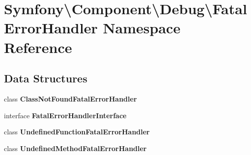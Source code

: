 \section{Symfony\textbackslash{}Component\textbackslash{}Debug\textbackslash{}Fatal\+Error\+Handler Namespace Reference}
\label{namespace_symfony_1_1_component_1_1_debug_1_1_fatal_error_handler}
\subsection*{Data Structures}
\begin{DoxyCompactItemize}
\item 
class {\bf Class\+Not\+Found\+Fatal\+Error\+Handler}
\item 
interface {\bf Fatal\+Error\+Handler\+Interface}
\item 
class {\bf Undefined\+Function\+Fatal\+Error\+Handler}
\item 
class {\bf Undefined\+Method\+Fatal\+Error\+Handler}
\end{DoxyCompactItemize}

